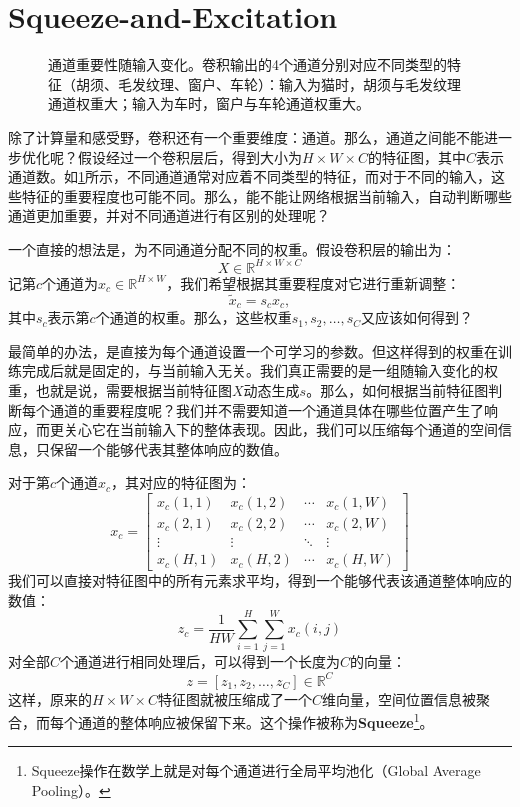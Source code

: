 \section{Squeeze-and-Excitation}

\begin{figure}[H]
    \caption{通道重要性随输入变化。卷积输出的4个通道分别对应不同类型的特征（胡须、毛发纹理、窗户、车轮）：输入为猫时，胡须与毛发纹理通道权重大；输入为车时，窗户与车轮通道权重大。}
    \label{fig:channel}
\end{figure}

除了计算量和感受野，卷积还有一个重要维度：通道。那么，通道之间能不能进一步优化呢？假设经过一个卷积层后，得到大小为$H\times W\times C$的特征图，其中$C$表示通道数。如\cref{fig:channel}所示，不同通道通常对应着不同类型的特征，而对于不同的输入，这些特征的重要程度也可能不同。那么，能不能让网络根据当前输入，自动判断哪些通道更加重要，并对不同通道进行有区别的处理呢？

一个直接的想法是，为不同通道分配不同的权重。假设卷积层的输出为：
$$
X\in\mathbb{R}^{H\times W\times C}
$$
记第$c$个通道为$x_c\in\mathbb{R}^{H\times W}$，我们希望根据其重要程度对它进行重新调整：
$$
\widetilde{x}_c=s_cx_c,
$$
其中$s_c$表示第$c$个通道的权重。那么，这些权重$s_1,s_2,\ldots,s_C$又应该如何得到？

最简单的办法，是直接为每个通道设置一个可学习的参数。但这样得到的权重在训练完成后就是固定的，与当前输入无关。我们真正需要的是一组随输入变化的权重，也就是说，需要根据当前特征图$X$动态生成$s$。那么，如何根据当前特征图判断每个通道的重要程度呢？我们并不需要知道一个通道具体在哪些位置产生了响应，而更关心它在当前输入下的整体表现。因此，我们可以压缩每个通道的空间信息，只保留一个能够代表其整体响应的数值。

对于第$c$个通道$x_c$，其对应的特征图为：
$$
x_c=\begin{bmatrix}
x_c(1,1) & x_c(1,2) & \cdots & x_c(1,W)\\
x_c(2,1) & x_c(2,2) & \cdots & x_c(2,W)\\
\vdots & \vdots & \ddots & \vdots\\
x_c(H,1) & x_c(H,2) & \cdots & x_c(H,W)
\end{bmatrix}
$$
我们可以直接对特征图中的所有元素求平均，得到一个能够代表该通道整体响应的数值：
$$
z_c=\frac{1}{HW}\sum_{i=1}^{H}\sum_{j=1}^{W}x_c(i,j)
$$
对全部$C$个通道进行相同处理后，可以得到一个长度为$C$的向量：
$$
z=[z_1,z_2,\ldots,z_C]\in\mathbb{R}^{C}
$$
这样，原来的$H\times W\times C$特征图就被压缩成了一个$C$维向量，空间位置信息被聚合，而每个通道的整体响应被保留下来。这个操作被称为\textbf{Squeeze}\footnote{Squeeze操作在数学上就是对每个通道进行全局平均池化（Global Average Pooling）。}。

